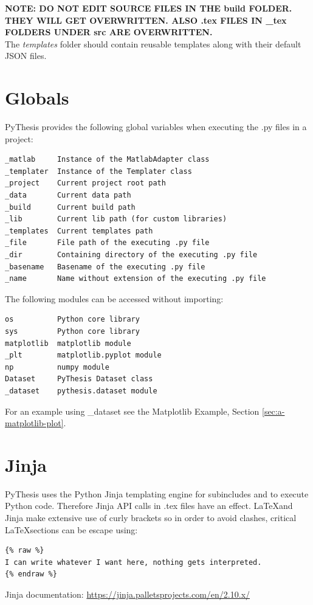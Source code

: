 \documentclass[a4paper]{book}
\begin{document}
\textbf{NOTE: DO NOT EDIT SOURCE FILES IN THE build FOLDER. THEY WILL GET OVERWRITTEN. ALSO .tex FILES IN \_tex FOLDERS UNDER src ARE OVERWRITTEN.} \\

The \emph{templates} folder should contain reusable templates along with their default JSON files.
\section{Globals}
\label{sec:globals}
PyThesis provides the following global variables when executing the .py files in a project:
\begin{verbatim}
_matlab     Instance of the MatlabAdapter class
_templater  Instance of the Templater class 
_project    Current project root path
_data       Current data path 
_build      Current build path 
_lib        Current lib path (for custom libraries)
_templates  Current templates path 
_file       File path of the executing .py file 
_dir        Containing directory of the executing .py file 
_basename   Basename of the executing .py file 
_name       Name without extension of the executing .py file 
\end{verbatim}

The following modules can be accessed without importing:
\begin{verbatim}
os          Python core library
sys         Python core library
matplotlib  matplotlib module
_plt        matplotlib.pyplot module
np          numpy module
Dataset     PyThesis Dataset class
_dataset    pythesis.dataset module
\end{verbatim}
For an example using \_dataset see the Matplotlib Example, Section \ref{sec:a-matplotlib-plot}.
\section{Jinja}
\label{sec:jinja}
PyThesis uses the Python Jinja templating engine for subincludes and to execute Python code. Therefore Jinja API calls in .tex files have an effect. \LaTeX and Jinja make extensive use of curly brackets so in order to avoid clashes, critical \LaTeX sections can be escape using:
\begin{verbatim}
{% raw %}
I can write whatever I want here, nothing gets interpreted.
{% endraw %}
\end{verbatim}

Jinja documentation: \url{https://jinja.palletsprojects.com/en/2.10.x/}
\end{document}
